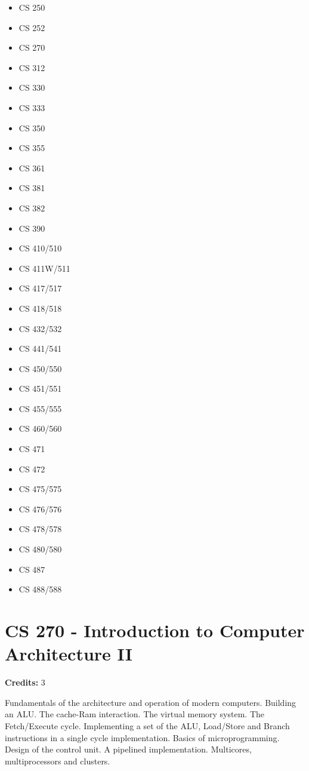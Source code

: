 \documentclass[]{article}
\providecommand{\tightlist}{%
  \setlength{\itemsep}{0pt}\setlength{\parskip}{0pt}}
\begin{document}
\begin{multicols}{2}
\begin{itemize}
\tightlist
\item
  CS 250
\item
  CS 252
\item
  CS 270
\item
  CS 312
\item
  CS 330
\item
  CS 333
\item
  CS 350
\item
  CS 355
\item
  CS 361
\item
  CS 381
\item
  CS 382
\item
  CS 390
\item
  CS 410/510
\item
  CS 411W/511
\item
  CS 417/517
\item
  CS 418/518
\item
  CS 432/532
\item
  CS 441/541
\item
  CS 450/550
\item
  CS 451/551
\item
  CS 455/555
\item
  CS 460/560
\item
  CS 471
\item
  CS 472
\item
  CS 475/575
\item
  CS 476/576
\item
  CS 478/578
\item
  CS 480/580
\item
  CS 487
\item
  CS 488/588
\end{itemize}
\end{multicols}


\section{CS 270 - Introduction to Computer Architecture
II}\label{cs-270---introduction-to-computer-architecture-ii}

\textbf{Credits:} 3

Fundamentals of the architecture and operation of modern computers.
Building an ALU. The cache-Ram interaction. The virtual memory system.
The Fetch/Execute cycle. Implementing a set of the ALU, Load/Store and
Branch instructions in a single cycle implementation. Basics of
microprogramming. Design of the control unit. A pipelined
implementation. Multicores, multiprocessors and clusters.
\end{document}
